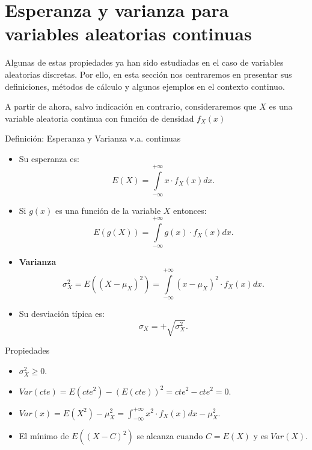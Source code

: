 \documentclass[
  letterpaper,
  DIV=11,
  numbers=noendperiod]{scrreprt}
\providecommand{\tightlist}{%
  \setlength{\itemsep}{0pt}\setlength{\parskip}{0pt}}\usepackage{longtable,booktabs,array}
\begin{document}
\section{Esperanza y varianza para variables aleatorias
continuas}\label{esperanza-y-varianza-para-variables-aleatorias-continuas}

Algunas de estas propiedades ya han sido estudiadas en el caso de
variables aleatorias discretas. Por ello, en esta sección nos
centraremos en presentar sus definiciones, métodos de cálculo y algunos
ejemplos en el contexto continuo.

A partir de ahora, salvo indicación en contrario, consideraremos que
\(X\) es una variable aleatoria continua con función de densidad
\(f_{X}(x)\)

\begin{Definicion}{Definición: Esperanza y Varianza v.a. continuas}{}

\begin{itemize}
\tightlist
\item
  Su esperanza es:
  \[E(X)=\displaystyle\int\limits_{-\infty}^{+\infty} x\cdot f_{X}(x)dx.\]
\item
  Si \(g(x)\) es una función de la variable \(X\) entonces:
  \[E(g(X))=\displaystyle\int\limits_{-\infty}^{+\infty} g(x)\cdot f_{X}(x)dx.\]
\item
  \textbf{Varianza} \[\sigma_{X}^2=E((X-\mu_{X})^2)=
    \displaystyle\int\limits_{-\infty}^{+\infty} (x-\mu_{X})^2 \cdot f_{X}(x)dx.
    \]
\item
  Su desviación típica es: \[\sigma_{X}=+\sqrt{\sigma_{X}^2}.\]
\end{itemize}

\end{Definicion}

\begin{Proposicion}{Propiedades}{}

\begin{itemize}
\tightlist
\item
  \(\sigma_{X}^2\geq 0\).
\item
  \(Var(cte)=E(cte^2)-(E(cte))^2= cte^2 - cte^2=0\).
\item
  \(\displaystyle Var(x)=E(X^2)-\mu_{X}^2=\int_{-\infty}^{+\infty}x^2\cdot  f_{X}(x)dx - \mu_{X}^2.\)
\item
  El mínimo de \(E((X-C)^2)\) se alcanza cuando \(C=E(X)\) y es
  \(Var(X)\).
\end{itemize}

\end{Proposicion}
\end{document}
